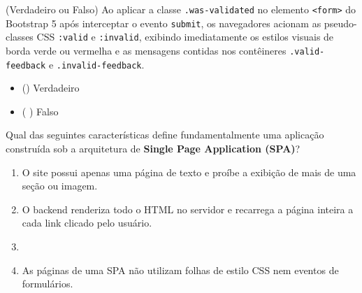 \begin{tcolorbox}[colback=white, colframe=azulTitulo, title=\textbf{Questão 11: Validação Visual no Cliente (Bootstrap 5)}]
    (Verdadeiro ou Falso) Ao aplicar a classe \texttt{.was-validated} no elemento \texttt{<form>} do Bootstrap 5 após interceptar o evento \texttt{submit}, os navegadores acionam as pseudo-classes CSS \texttt{:valid} e \texttt{:invalid}, exibindo imediatamente os estilos visuais de borda verde ou vermelha e as mensagens contidas nos contêineres \texttt{.valid-feedback} e \texttt{.invalid-feedback}.
    \begin{itemize}
        \item () Verdadeiro
        \item ( ) Falso
    \end{itemize}
\end{tcolorbox}

\newpage

\begin{tcolorbox}[colback=white, colframe=azulTitulo, title=\textbf{Questão 12: Arquitetura de Single Page Applications (SPAs)}]
    Qual das seguintes características define fundamentalmente uma aplicação construída sob a arquitetura de \textbf{Single Page Application (SPA)}?
    \begin{enumerate}[label=\alph*)]
        \item O site possui apenas uma página de texto e proíbe a exibição de mais de uma seção ou imagem.
        \item O backend renderiza todo o HTML no servidor e recarrega a página inteira a cada link clicado pelo usuário.
        \item {}
        \item As páginas de uma SPA não utilizam folhas de estilo CSS nem eventos de formulários.
    \end{enumerate}
\end{tcolorbox}

